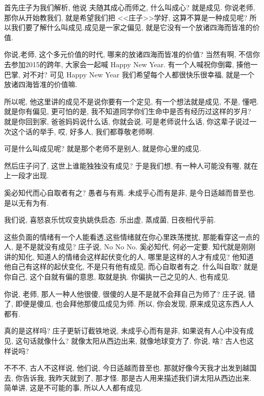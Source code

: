 \documentclass[11pt]{article}
\begin{document}
首先庄子为我们解析, 他说{\color{blue} 夫随其成心而师之,} 什么叫成心? 就是成见. 	你说老师, 那你从开始教我们, 就是希望我们把 <<庄子>>学好, 这算不算是一种成见呢? 所以我们要了解什么叫成见.成见是一家之偏见, 就是它没有一个放诸四海而皆准的价值.

你说,老师, 这个多元价值的时代, 哪来的放诸四海而皆准的价值? 当然有啊, 不信你去参加2015的跨年, 大家会一起喊 Happy New Year. 有一个人喊祝你倒霉, 揍他一巴掌, 对不对? 可见 Happy New Year 我们希望每个人都很快乐很幸福, 就是一个放诸四海皆准的价值嘛. 

所以呢, 他这里讲的成见不是说你要有一个定见, 有一个想法就是成见, 不是, 懂吧. 就是你有偏见, 更可怕的是, 我不知道同学你们生命中是否有经历过这样的岁月? 就是你回到家, 爸爸妈妈说什么话, 你就会说, 可是老师说什么话, 你这辈子说过一次这个话的举手, 哎, 好多人, 我们都尊敬老师啊.

可是什么叫成见呢? 就是那个老师不是别人, 就是你心里的成见.

然后庄子问了, 这世上谁能独独没有成见? 于是我们想, 有一种人可能没有喔, 就在上一段才出现. 

{\begin{center}
		{\color{green} 奚必知代而心自取者有之? 愚者与有焉. 未成乎心而有是非, 是今日适越而昔至也. 是以无有为有. }
\end{center}}

\vspace{-0.5cm}

我们说, 喜怒哀乐忧叹变执姚佚启态. 乐出虚, 蒸成菌, 日夜相代乎前. 

这些负面的情绪有一个人能看透,这些情绪就在你心里跌荡搅扰, 那能看穿这一点的人, 是不是就没有成见? 庄子说, No No No. {\color{blue}奚必知代,} 何必一定要. 知代就是刚刚讲的知化, 知道人的情绪会这样起伏变化的人, 哪里是这样的人才有成见? 他知道他自己有这样的起伏变化, 不是只有他有成见, {\color{blue} 而心自取者有之.} 什么叫自取? 就是你自己, 这个自就有偏的意思, 取就是执. 你偏执一己之见的人, 也有成见. 

你说, 老师, 那人一种人他很傻, 很傻的人是不是就不会拜自己为师了? 庄子说, 错了, 即便是傻瓜, 也会拜他那傻瓜成见为师. 所以, 你会发现, 原来成见这东西人人都有.

真的是这样吗? 庄子更斩订截铁地说, {\color{blue} 未成乎心而有是非}, 如果说有人心中没有成见, 这句话就像什么? 就像太阳从西边出来, 就像地球变方了. 你说, 啥? 古人也这样说吗?

不不不, 古人不这样说, 他们说, 今日适越而昔至也. 那就好像今天我才出发到越国去, 你告诉我, 我昨天就到了, 那才怪. 那是古人用来描述我们讲太阳从西边出来. 简单讲, 这是不可能的事, 所以人人都有成见.
\end{document}
